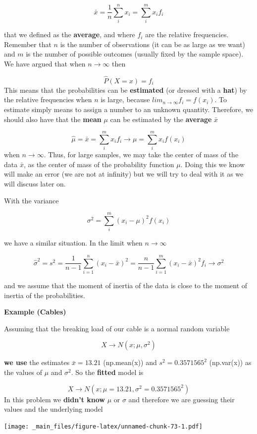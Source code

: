 \documentclass[
]{book}
\begin{document}
\[\bar{x}= \frac{1}{n} \sum_{i}^n x_i = \sum_{i}^m x_if_i\]

that we defined as the \textbf{average}, and where \(f_i\) are the relative frequencies. Remember that \(n\) is the number of observations (it can be as large as we want) and \(m\) is the number of possible outcomes (usually fixed by the sample space). We have argued that when \(n \rightarrow \infty\) then

\[\hat{P}(X=x)=f_i\]
This means that the probabilities can be \textbf{estimated} (or dressed with a \textbf{hat}) by the relative frequencies when \(n\) is large, because \(lim_{n\rightarrow \infty}f_i=f(x_i)\). To estimate simply means to assign a number to an unknown quantity. Therefore, we should also have that the \textbf{mean} \(\mu\) can be estimated by the \textbf{average} \(\bar{x}\)

\[\hat{\mu}=\bar{x}= \sum_{i}^m x_if_i \rightarrow \mu=\sum_{i}^m x_i f(x_i)\]
when \(n\rightarrow \infty\). Thus, for large samples, we may take the center of mass of the data \(\bar{x}\), as the center of mass of the probability function \(\mu\). Doing this we know will make an error (we are not at infinity) but we will try to deal with it as we will discuss later on.

With the variance

\[\sigma^2=\sum_{i}^m(x_i-\mu)^2f(x_i)\]

we have a similar situation. In the limit when \(n \rightarrow \infty\)

\[\hat{\sigma}^2=s^2=\frac{1}{n-1}\sum_{i=1}^n(x_i-\bar{x})^2=\frac{n}{n-1}\sum_{i=1}^m(x_i-\bar{x})^2 f_i \rightarrow \sigma^2\]

and we assume that the moment of inertia of the data is close to the moment of inertia of the probabilities.

\textbf{Example (Cables)}

Assuming that the breaking load of our cable is a normal random variable

\[X \rightarrow N(x; \mu, \sigma^2)\]

\textbf{we use} the estimates \(\bar{x}=13.21\) (np.mean(x)) and \(s^2=0.3571565^2\) (np.var(x)) as the values of \(\mu\) and \(\sigma^2\). So the \textbf{fitted} model is

\[X \rightarrow N(x; \mu=13.21, \sigma^2=0.3571565^2)\]
In this problem we \textbf{didn't know} \(\mu\) or \(\sigma\) and therefore we are guessing their values and the underlying model

\texttt{[image: \_main\_files/figure-latex/unnamed-chunk-73-1.pdf]}
\end{document}
